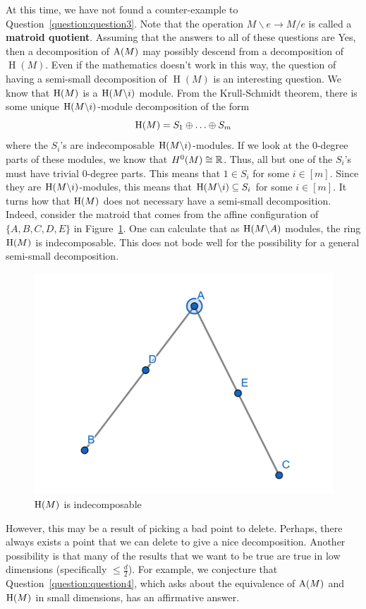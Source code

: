 \documentclass{puthesis-UG}
\begin{document}
At this time, we have not found a counter-example to Question~\ref{question:question3}. Note that the operation $M \backslash e \to M / e$ is called a \textbf{matroid quotient}. Assuming that the answers to all of these questions are Yes, then a decomposition of $\operatorname{A}(M)$ may possibly descend from a decomposition of $\operatorname{H}(M)$. Even if the mathematics doesn't work in this way, the question of having a semi-small decomposition of $\operatorname{H}(M)$ is an interesting question. We know that $\operatorname{H}(M)$ is a $\operatorname{H}(M \backslash i)$ module. From the Krull-Schmidt theorem, there is some unique $\operatorname{H}(M \backslash i)$-module decomposition of the form
\[
	\operatorname{H}(M) = S_1 \oplus \ldots \oplus S_m
\]
where the $S_i$'s are indecomposable $\operatorname{H}(M \backslash i)$-modules. If we look at the $0$-degree parts of these modules, we know that $H^0(M) \cong \mathbb{R}$. Thus, all but one of the $S_i$'s must have trivial $0$-degree parts. This means that $1 \in S_i$ for some $i \in [m]$. Since they are $\operatorname{H}(M \backslash i)$-modules, this means that $\operatorname{H} (M \backslash i) \subseteq S_i$ for some $i \in [m]$. It turns how that $\operatorname{H}(M)$ does not necessary have a semi-small decomposition. Indeed, consider the matroid that comes from the affine configuration of $\{A, B, C, D, E\}$ in Figure~\ref{fig:indecomposable}. One can calculate that as $\operatorname{H} (M \backslash A)$ modules, the ring $\operatorname{H}(M)$ is indecomposable. This does not bode well for the possibility for a general semi-small decomposition. 
\begin{figure}[h]
	\begin{center}
		\includegraphics[scale = 0.5]{image3.png}
		\caption{$\operatorname{H}(M)$ is indecomposable}
		\label{fig:indecomposable}
	\end{center}
\end{figure}
However, this may be a result of picking a bad point to delete. Perhaps, there always exists a point that we can delete to give a nice decomposition. Another possibility is that many of the results that we want to be true are true in low dimensions (specifically $\leq \frac{d}{2}$). For example, we conjecture that Question~\ref{question:question4}, which asks about the equivalence of $\operatorname{A}(M)$ and $\operatorname{H}(M)$ in small dimensions, has an affirmative answer. 
\end{document}
